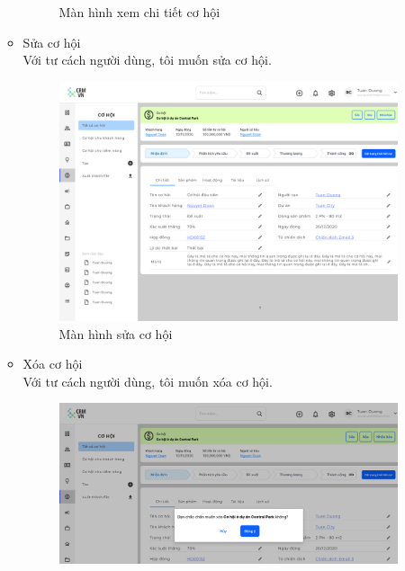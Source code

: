 \documentclass[12pt,a4paper]{article}
\begin{document}
\begin{enumerate}
\begin{itemize}
\begin{figure}[H]
                \vspace{0.5cm}
                \caption{Màn hình xem chi tiết cơ hội }
                \label{chitietcohoii}
            \end{figure}
            \item Sửa cơ hội \\
            Với tư cách người dùng, tôi muốn sửa cơ hội.
            \begin{figure}[H]
                \centering \includegraphics[width=\textwidth]{Img/Nguyet/Cohoi/chitietcohoi.png}
                \vspace{0.5cm}
                \caption{Màn hình sửa cơ hội }
                \label{suacohoii}
            \end{figure}
            \item Xóa cơ hội \\
            Với tư cách người dùng, tôi muốn xóa cơ hội.
            \begin{figure}[H]
                \centering \includegraphics[width=\textwidth]{Img/Nguyet/Cohoi/xoacohoi.png}

\end{figure}
\end{itemize}
\end{enumerate}
\end{document}
